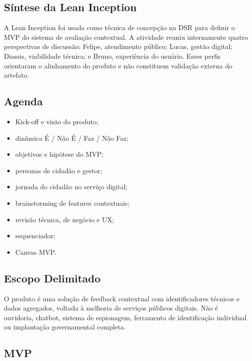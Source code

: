 \begin{apendicesenv}

\chapter{Síntese da Lean Inception}
\label{ap:A}

A Lean Inception foi usada como técnica de concepção na DSR para definir o MVP do sistema de avaliação contextual. A atividade reuniu internamente quatro perspectivas de discussão: Felipe, atendimento público; Lucas, gestão digital; Diassis, viabilidade técnica; e Bruno, experiência do usuário. Esses perfis orientaram o alinhamento do produto e não constituem validação externa do artefato.

\section{Agenda}
\label{sec:A.1}

\begin{itemize}
\item
  Kick-off e visão do produto;
\item
  dinâmica É / Não É / Faz / Não Faz;
\item
  objetivos e hipótese do MVP;
\item
  personas de cidadão e gestor;
\item
  jornada do cidadão no serviço digital;
\item
  brainstorming de features contextuais;
\item
  revisão técnica, de negócio e UX;
\item
  sequenciador;
\item
  Canvas MVP.
\end{itemize}

\section{Escopo Delimitado}
\label{sec:A.2}

O produto é uma solução de feedback contextual com identificadores técnicos e dados agregados, voltada à melhoria de serviços públicos digitais. Não é ouvidoria, chatbot, sistema de espionagem, ferramenta de identificação individual ou implantação governamental completa.

\section{MVP}
\label{sec:A.3}


\end{apendicesenv}

